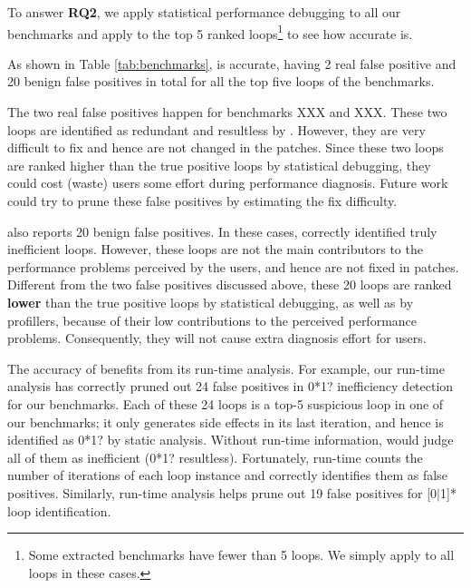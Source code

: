 %
{\color{red}
To answer \textbf{RQ2}, we apply
statistical performance debugging \cite{SongOOPSLA2014} to all our benchmarks
and apply \Tool to the top 5 ranked loops\footnote{Some extracted benchmarks
have fewer than 5 loops. We simply apply \Tool to all loops in these cases.}
to see how accurate \Tool is. 
}
{\color{red}
As shown in Table \ref{tab:benchmarks}, \Tool is accurate, having 2 real
false positive and 20 benign false positives in total for all the top five loops
of the \allbugs benchmarks.


The two real false positives happen for benchmarks XXX and XXX.
These two loops are identified as
redundant and resultless by \Tool. However, they
are very difficult to fix and hence are not changed in the patches.
Since these two loops are ranked higher than the true positive loops by
statistical debugging, they could cost (waste) \Tool users some effort during 
performance diagnosis. Future work could try to prune these false positives
by estimating the fix difficulty.

\Tool also reports 20 benign false positives.
In these cases, \Tool correctly identified truly inefficient loops.
However, these loops are not the main contributors to the 
performance problems perceived by the users, and hence are not
fixed in patches. 
Different from the two false positives discussed above, these 20 loops are
ranked {\bf lower} than the true positive loops by statistical debugging, as
well as by profillers,
because of their low contributions to the perceived performance problems.
Consequently, they will not cause extra diagnosis effort for \Tool users.
}

The accuracy of \Tool benefits from its run-time analysis.
For example, our run-time analysis has correctly pruned out 24 false positives
in 0*1? inefficiency detection for our benchmarks. Each of these 24 loops is a
top-5 suspicious loop in one of our benchmarks; it only generates side effects
in its last iteration, and hence is identified as 0*1? by static analysis. 
Without run-time information, \Tool would judge
all of them as inefficient (0*1? resultless). Fortunately,
\Tool run-time counts the number of iterations of each loop instance and
correctly identifies them as false positives. Similarly, \Tool run-time analysis
helps prune out 19 false positives for [0$|$1]* loop identification.

